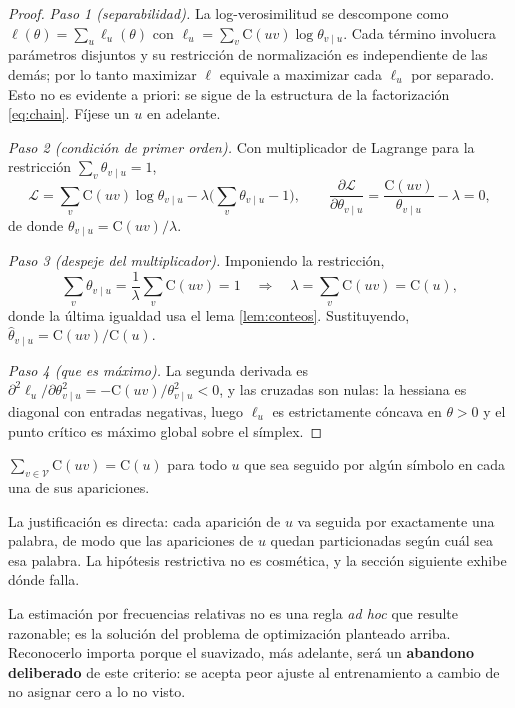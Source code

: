 \documentclass[11pt,letterpaper]{article}
\newcommand{\Count}{\mathrm{C}}
\newcommand{\Vocab}{\mathcal{V}}
\begin{document}
\begin{proof}
\emph{Paso 1 (separabilidad).} La log-verosimilitud se descompone como
$\ell(\theta)=\sum_u \ell_u(\theta)$ con $\ell_u=\sum_v
\Count(uv)\log\theta_{v\mid u}$. Cada término involucra parámetros disjuntos y
su restricción de normalización es independiente de las demás; por lo tanto
maximizar $\ell$ equivale a maximizar cada $\ell_u$ por separado. Esto no es
evidente a priori: se sigue de la estructura de la factorización
\eqref{eq:chain}. Fíjese un $u$ en adelante.

\emph{Paso 2 (condición de primer orden).} Con multiplicador de Lagrange para la
restricción $\sum_v\theta_{v\mid u}=1$,
\[
\mathcal{L}=\sum_v \Count(uv)\log\theta_{v\mid
u}-\lambda\Big(\sum_v\theta_{v\mid u}-1\Big),
\qquad
\frac{\partial\mathcal{L}}{\partial\theta_{v\mid
u}}=\frac{\Count(uv)}{\theta_{v\mid u}}-\lambda=0,
\]
de donde $\theta_{v\mid u}=\Count(uv)/\lambda$.

\emph{Paso 3 (despeje del multiplicador).} Imponiendo la restricción,
\[
\sum_v \theta_{v\mid u} = \frac{1}{\lambda}\sum_v \Count(uv) = 1
\quad\Longrightarrow\quad
\lambda = \sum_v \Count(uv) = \Count(u),
\]
donde la última igualdad usa el lema \ref{lem:conteos}. Sustituyendo,
$\hat\theta_{v\mid u}=\Count(uv)/\Count(u)$.

\emph{Paso 4 (que es máximo).} La segunda derivada es
$\partial^2\ell_u/\partial\theta_{v\mid u}^2=-\Count(uv)/\theta_{v\mid u}^2<0$,
y las cruzadas son nulas: la hessiana es diagonal con entradas negativas, luego
$\ell_u$ es estrictamente cóncava en $\theta>0$ y el punto crítico es máximo
global sobre el símplex. \qedhere
\end{proof}

\begin{lema}\label{lem:conteos}
$\sum_{v\in\Vocab}\Count(uv)=\Count(u)$ para todo $u$ que sea seguido por algún
símbolo en cada una de sus apariciones.
\end{lema}

La justificación es directa: cada aparición de $u$ va seguida por exactamente
una palabra, de modo que las apariciones de $u$ quedan particionadas según cuál
sea esa palabra. La hipótesis restrictiva no es cosmética, y la sección
siguiente exhibe dónde falla.

\begin{idea}[title={La fórmula es consecuencia, no punto de partida}]
La estimación por frecuencias relativas no es una regla \emph{ad hoc} que
resulte razonable; es la solución del problema de optimización planteado arriba.
Reconocerlo importa porque el suavizado, más adelante, será un \textbf{abandono
deliberado} de este criterio: se acepta peor ajuste al entrenamiento a cambio de
no asignar cero a lo no visto.
\end{idea}
\end{document}
